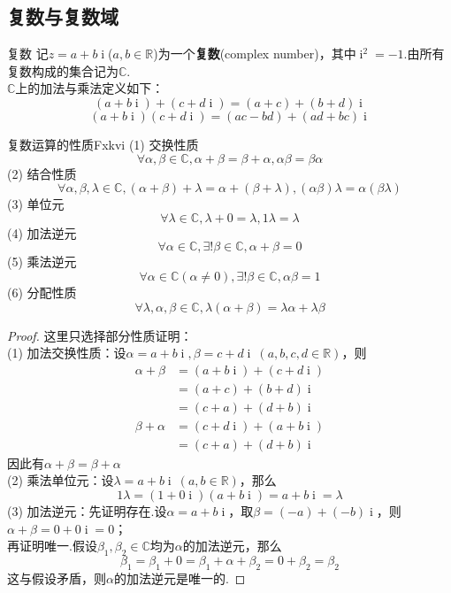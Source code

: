 \documentclass[lang=cn, zihao=5]{elegantbook}
\newcommand{\R}{\mathbb{R}}
\newcommand{\C}{\mathbb{C}}
\DeclareMathOperator{\ic}{i}
\begin{document}
\subsection{复数与复数域}

\begin{definition}{复数}
	记$z=a+b\ic $($a,b \in \R$)为一个\textbf{复数}(complex number)，其中$\ic ^2=-1$.由所有复数构成的集合记为$\C$. \\
	$\C$上的加法与乘法定义如下：
	$$(a+b\ic ) + (c+d\ic ) = (a+c) + (b+d)\ic $$
	$$(a+b\ic )(c+d\ic ) = (ac-bd) + (ad+bc)\ic $$
\end{definition}

\begin{proposition}{复数运算的性质}{Fxkvi}
	(1) 交换性质$$\forall \alpha , \beta \in \C , \alpha + \beta = \beta + \alpha , \alpha \beta = \beta \alpha$$
	(2) 结合性质$$\forall \alpha , \beta , \lambda \in \C , (\alpha + \beta) + \lambda = \alpha + (\beta + \lambda) , (\alpha \beta) \lambda = \alpha (\beta \lambda)$$
	(3) 单位元$$\forall \lambda \in \C , \lambda + 0 = \lambda , 1 \lambda = \lambda$$
	(4) 加法逆元$$\forall \alpha \in \C , \exists ! \beta \in \C , \alpha + \beta = 0$$
	(5) 乘法逆元$$\forall \alpha \in \C (\alpha \neq 0) , \exists ! \beta \in \C , \alpha \beta = 1$$
	(6) 分配性质$$\forall \lambda , \alpha , \beta \in \C , \lambda (\alpha + \beta) = \lambda \alpha + \lambda \beta$$
\end{proposition}
\begin{proof}
	这里只选择部分性质证明： \\
	(1) 加法交换性质：设$\alpha = a+b\ic , \beta = c+d\ic ~(a,b,c,d \in \R )$，则
	\begin{align*}
		\alpha + \beta &= (a+b\ic ) + (c+d\ic ) \\
		&= (a+c) + (b+d)\ic \\
		&= (c+a) + (d+b)\ic \\
		\beta + \alpha &= (c+d\ic ) + (a+b\ic ) \\
		&= (c+a) + (d+b)\ic
	\end{align*}
	因此有$\alpha + \beta = \beta + \alpha$ \\
	(2) 乘法单位元：设$\lambda = a+b\ic ~ (a,b \in \R )$，那么$$1 \lambda = (1+0\ic )(a+b\ic ) = a + b\ic = \lambda$$
	(3) 加法逆元：先证明存在.设$\alpha = a+b\ic $，取$\beta = (-a) + (-b)\ic $，则$\alpha + \beta = 0+0\ic = 0$；\\
	再证明唯一.假设$\beta _1, \beta _2 \in \C $均为$\alpha$的加法逆元，那么$$\beta _1 = \beta _1 + 0 = \beta _1 + \alpha + \beta _2 = 0 + \beta _2 = \beta _2$$
	这与假设矛盾，则$\alpha$的加法逆元是唯一的.
\end{proof}
\end{document}
